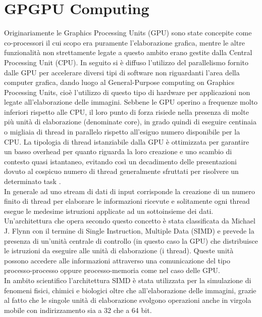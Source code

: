 \section{GPGPU Computing}

Originariamente le Graphics Processing Units (GPU) sono state concepite
come co-processori il cui scopo
era puramente l'elaborazione grafica, mentre le altre funzionalità
non strettamente legate a questo ambito erano gestite dalla 
Central Processing Unit (CPU).
In seguito si è diffuso l'utilizzo del parallelismo fornito dalle GPU
per accelerare diversi tipi di software non riguardanti
l'area della computer grafica, dando luogo al General-Purpose computing
on Graphics Processing Units, cioè l'utilizzo di questo tipo di hardware
per applicazioni non legate all'elaborazione delle immagini.
Sebbene le GPU operino a frequenze molto inferiori rispetto alle CPU, il loro
punto di forza risiede nella presenza di molte più unità di elaborazione
(denominate core), in grado quindi di eseguire centinaia o migliaia di thread
in parallelo rispetto all'esiguo numero disponibile per la CPU.
La tipologia di thread
istanziabile dalla GPU è ottimizzata per garantire un basso overhead
per quanto riguarda la loro creazione e uno scambio di contesto quasi
istantaneo, evitando così un decadimento delle presentazioni dovuto al cospicuo
numero di thread generalmente sfruttati per risolvere un determinato task
\cite{kirk2007nvidia}.
\\
In generale ad uno stream di dati di input corrisponde la creazione di un
numero finito di thread per elaborare le informazioni ricevute e solitamente
ogni thread esegue le medesime istruzioni applicate ad un sottoinsieme
dei dati. Un'architettura che opera secondo questo concetto è stata
classificata da Michael J. Flynn con il termine di Single Instruction, Multiple 
Data (SIMD)\cite{duncan1990survey} e prevede
la presenza di un'unità centrale di controllo (in questo caso la GPU) che
distribuisce le istruzioni da eseguire alle unità di elaborazione (i thread).
Queste unità possono accedere alle informazioni attraverso una comunicazione
del tipo processo-processo oppure processo-memoria come nel caso delle GPU.
\\
In ambito scientifico l'architettura SIMD è stata utilizzata per la simulazione
di fenomeni fisici, chimici e biologici oltre che all'elaborazione delle
immagini, grazie al fatto che le singole unità di elaborazione svolgono
operazioni anche in virgola mobile con indirizzamento sia a 32 che a 64 bit.
\\
